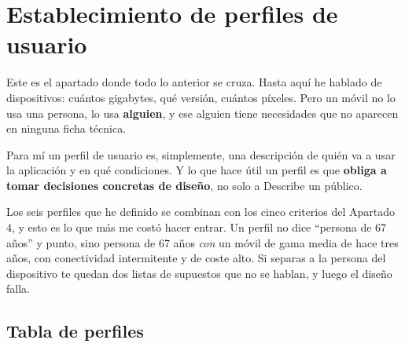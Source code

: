 \newpage
\section{Establecimiento de perfiles de usuario}

Este es el apartado donde todo lo anterior se cruza. Hasta aquí he hablado de dispositivos: cuántos gigabytes, qué versión, cuántos píxeles. Pero un móvil no lo usa una persona, lo usa \textbf{alguien}, y ese alguien tiene necesidades que no aparecen en ninguna ficha técnica.

Para mí un perfil de usuario es, simplemente, una descripción de quién va a usar la aplicación y en qué condiciones. Y lo que hace útil un perfil es que \textbf{obliga a tomar decisiones concretas de diseño}, no solo a Describe un público.

Los seis perfiles que he definido se combinan con los cinco criterios del Apartado 4, y esto es lo que más me costó hacer entrar. Un perfil no dice \enquote{persona de 67 años} y punto, sino persona de 67 años \emph{con} un móvil de gama media de hace tres años, con conectividad intermitente y de coste alto. Si separas a la persona del dispositivo te quedan dos listas de supuestos que no se hablan, y luego el diseño falla.

\subsection{Tabla de perfiles}

